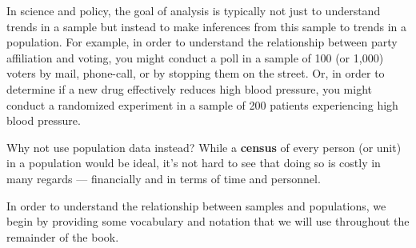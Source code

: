 \documentclass[
  letterpaper,
  DIV=11,
  numbers=noendperiod]{scrreprt}
\theoremstyle{definition}
\theoremstyle{remark}
\begin{document}
In science and policy, the goal of analysis is typically not just to
understand trends in a sample but instead to make inferences from this
sample to trends in a population. For example, in order to understand
the relationship between party affiliation and voting, you might conduct
a poll in a sample of 100 (or 1,000) voters by mail, phone-call, or by
stopping them on the street. Or, in order to determine if a new drug
effectively reduces high blood pressure, you might conduct a randomized
experiment in a sample of 200 patients experiencing high blood pressure.

Why not use population data instead? While a \textbf{census} of every
person (or unit) in a population would be ideal, it's not hard to see
that doing so is costly in many regards --- financially and in terms of
time and personnel.

In order to understand the relationship between samples and populations,
we begin by providing some vocabulary and notation that we will use
throughout the remainder of the book.
\end{document}
